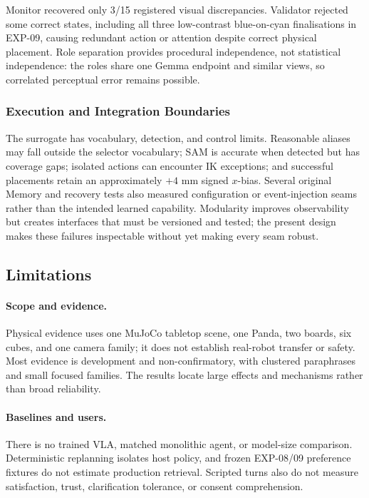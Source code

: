 Monitor recovered only 3/15 registered visual discrepancies. Validator rejected
some correct states, including all three low-contrast blue-on-cyan finalisations
in EXP-09, causing redundant action or attention despite correct physical
placement. Role separation provides procedural independence, not statistical
independence: the roles share one Gemma endpoint and similar views, so correlated
perceptual error remains possible.

\subsubsection{Execution and Integration Boundaries}

The surrogate has vocabulary, detection, and control limits. Reasonable aliases
may fall outside the selector vocabulary; SAM is accurate when detected but has
coverage gaps; isolated actions can encounter IK exceptions; and successful
placements retain an approximately $+4$ mm signed $x$-bias. Several original
Memory and recovery tests also measured configuration or event-injection seams
rather than the intended learned capability. Modularity improves observability
but creates interfaces that must be versioned and tested; the present design
makes these failures inspectable without yet making every seam robust.

\subsection{Limitations}
\label{subsec:discussion-limitations}

\paragraph{Scope and evidence.}
Physical evidence uses one MuJoCo tabletop scene, one Panda, two boards, six
cubes, and one camera family; it does not establish real-robot transfer or
safety. Most evidence is development and non-confirmatory, with clustered
paraphrases and small focused families. The results locate large effects and
mechanisms rather than broad reliability.

\paragraph{Baselines and users.}
There is no trained VLA, matched monolithic agent, or model-size comparison.
Deterministic replanning isolates host policy, and frozen EXP-08/09 preference
fixtures do not estimate production retrieval. Scripted turns also do not
measure satisfaction, trust, clarification tolerance, or consent comprehension.

